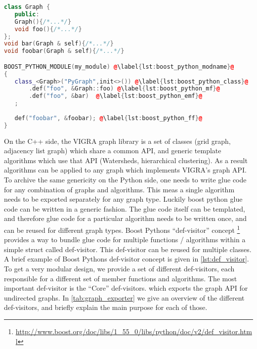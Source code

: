 \vspace{0.3cm}
\begin{lstlisting}[language=c++]
class Graph {
   public:
   Graph(){/*...*/}
   void foo(){/*...*/}
};
void bar(Graph & self){/*...*/}
void foobar(Graph & self){/*...*/}

BOOST_PYTHON_MODULE(my_module) @\label{lst:boost_python_modname}@
{   
   class_<Graph>("PyGraph",init<>()) @\label{lst:boost_python_class}@
       .def("foo", &Graph::foo) @\label{lst:boost_python_mf}@
       .def("foo", &bar)  @\label{lst:boost_python_emf}@
   ;                                      
   
   def("foobar", &foobar); @\label{lst:boost_python_ff}@
}
\end{lstlisting}
\vspace{-1.4cm}

On the C++ side, the VIGRA graph library is a set of classes (\ie grid graph, adjacency list graph) 
which share a common API, 
and generic template algorithms which use that API (\ie Watersheds, hierarchical clustering).
As a result algorithms can be applied to any graph which implements VIGRA's graph API.
To archive the same genericity on the Python side, one
needs to write glue code for any combination of graphs and algorithms.
This meas a single algorithm needs to be exported separately for any
graph type. 
Luckily boost python glue code can be written in a generic fashion.
The glue code itself can be templated, and therefore 
glue code for a particular algorithm needs to be written once, 
and can be reused for different graph types.
Boost Pythons ``def-visitor'' concept \footnote{\url{http://www.boost.org/doc/libs/1_55_0/libs/python/doc/v2/def_visitor.html}}
provides a way to bundle glue code for multiple functions / algorithms within a simple struct called def-visitor.
This def-visitor can be reused for multiple classes.
A brief example of Boost Pythons def-visitor concept is given in \cref{lst:def_visitor}.
To get a very modular design, we provide a set of different def-visitors,
each responsible for a different set of member functions and algorithms.
The most important def-visitor is the ``Core'' def-visitors.
which exports the graph API for undirected graphs.
In \cref{tab:graph_exporter} we give an overview of 
the different def-visitors, and briefly explain the main purpose
for each of those.

